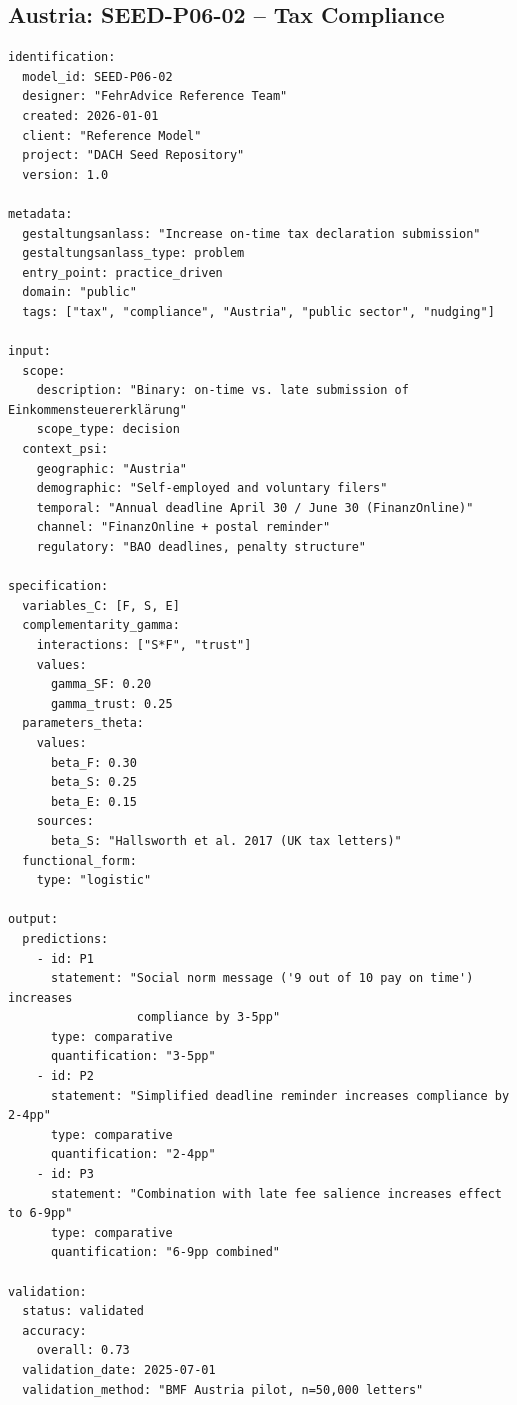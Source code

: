 \subsection{Austria: SEED-P06-02 -- Tax Compliance}

\begin{tcolorbox}[colback=white, colframe=blue!50!black,
    title=SEED-P06-02: Tax Declaration Timeliness (Austria)]
\begin{verbatim}
identification:
  model_id: SEED-P06-02
  designer: "FehrAdvice Reference Team"
  created: 2026-01-01
  client: "Reference Model"
  project: "DACH Seed Repository"
  version: 1.0

metadata:
  gestaltungsanlass: "Increase on-time tax declaration submission"
  gestaltungsanlass_type: problem
  entry_point: practice_driven
  domain: "public"
  tags: ["tax", "compliance", "Austria", "public sector", "nudging"]

input:
  scope:
    description: "Binary: on-time vs. late submission of Einkommensteuererklärung"
    scope_type: decision
  context_psi:
    geographic: "Austria"
    demographic: "Self-employed and voluntary filers"
    temporal: "Annual deadline April 30 / June 30 (FinanzOnline)"
    channel: "FinanzOnline + postal reminder"
    regulatory: "BAO deadlines, penalty structure"

specification:
  variables_C: [F, S, E]
  complementarity_gamma:
    interactions: ["S*F", "trust"]
    values:
      gamma_SF: 0.20
      gamma_trust: 0.25
  parameters_theta:
    values:
      beta_F: 0.30
      beta_S: 0.25
      beta_E: 0.15
    sources:
      beta_S: "Hallsworth et al. 2017 (UK tax letters)"
  functional_form:
    type: "logistic"

output:
  predictions:
    - id: P1
      statement: "Social norm message ('9 out of 10 pay on time') increases
                  compliance by 3-5pp"
      type: comparative
      quantification: "3-5pp"
    - id: P2
      statement: "Simplified deadline reminder increases compliance by 2-4pp"
      type: comparative
      quantification: "2-4pp"
    - id: P3
      statement: "Combination with late fee salience increases effect to 6-9pp"
      type: comparative
      quantification: "6-9pp combined"

validation:
  status: validated
  accuracy:
    overall: 0.73
  validation_date: 2025-07-01
  validation_method: "BMF Austria pilot, n=50,000 letters"
\end{verbatim}
\end{tcolorbox}

